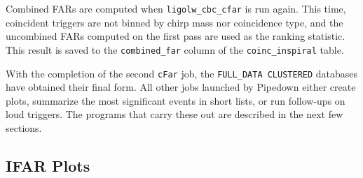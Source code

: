 Combined \acp{FAR} are computed when \verb|ligolw_cbc_cfar| is run again. This
time, coincident triggers are not binned by chirp mass nor coincidence type,
and the uncombined \acp{FAR} computed on the first pass are used as the ranking
statistic. This result is saved to the \verb|combined_far| column of the
\verb|coinc_inspiral| table.

With the completion of the second \verb|cFar| job, the \verb|FULL_DATA CLUSTERED|
databases have obtained their final form. All other jobs launched by
Pipedown either create plots, summarize the most significant events in short
lists, or run follow-ups on loud triggers. The programs that carry these out are
described in the next few sections.

\subsection{IFAR Plots}
\label{sec:plotifar}

